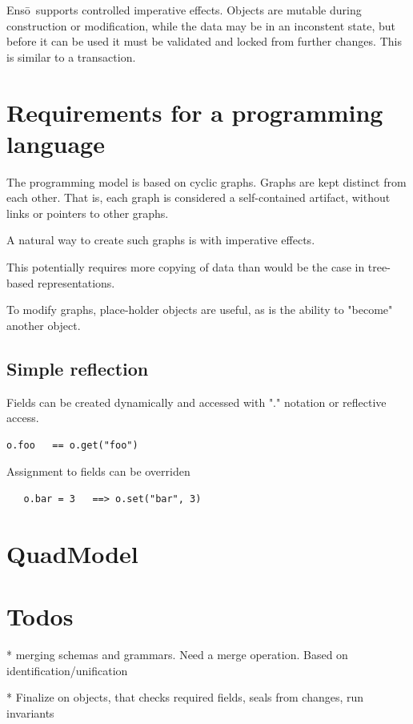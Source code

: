 \documentclass[11pt]{article}
\newcommand{\Enso}{Ens\={o}}
\begin{document}
\Enso\ supports controlled imperative effects. Objects are
mutable during construction or modification, while the data may be in an
inconstent state, but before it can be used it must be validated
and locked from further changes. This is similar to a transaction.



\section{Requirements for a programming language}

The programming model is based on cyclic graphs.
Graphs are kept distinct from each other. That is,
each graph is considered a self-contained
artifact, without links or pointers to other graphs.

A natural way to create such graphs is with 
imperative effects.

This potentially requires more copying of data
than would be the case in tree-based representations.

To modify graphs, place-holder objects are useful,
as is the ability to "become" another object.

\subsection{Simple reflection}

Fields can be created dynamically and accessed with
"." notation or reflective access.

\begin{verbatim}
o.foo   == o.get("foo")
\end{verbatim}

Assignment to fields can be overriden
\begin{verbatim}
   o.bar = 3   ==> o.set("bar", 3)
\end{verbatim}



\section{QuadModel}

\section{Todos}

* merging schemas and grammars. Need a merge operation. Based on identification/unification

* Finalize on objects, that checks required fields, seals from changes, run invariants
   
\end{document}
